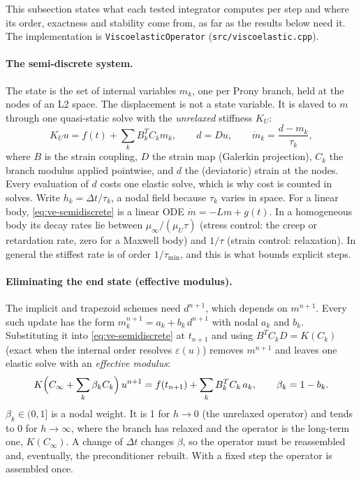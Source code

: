 \documentclass[11pt]{article}
\numberwithin{equation}{section}
\newcommand{\eps}{\varepsilon}
\newcommand{\code}[1]{\texttt{#1}}
\begin{document}
This subsection states what each tested integrator computes per step and
where its order, exactness and stability come from, as far as the results
below need it. The implementation is \code{ViscoelasticOperator}
(\code{src/viscoelastic.cpp}).

\paragraph{The semi-discrete system.}
The state is the set of internal variables $m_k$, one per Prony branch,
held at the nodes of an L2 space. The displacement is not a state
variable. It is slaved to $m$ through one quasi-static solve with the
\emph{unrelaxed} stiffness $K_U$:
\begin{equation}
  K_U u = f(t) + \sum_k B_k^{T} C_k m_k,\qquad d = D u,\qquad
  \dot m_k = \frac{d - m_k}{\tau_k},
  \label{eq:ve-semidiscrete}
\end{equation}
where $B$ is the strain coupling, $D$ the strain map (Galerkin projection),
$C_k$ the branch modulus applied pointwise, and $d$ the (deviatoric)
strain at the nodes. Every evaluation of $d$ costs one elastic solve, which
is why cost is counted in solves. Write $h_k=\Delta t/\tau_k$, a nodal field
because $\tau_k$ varies in space. For a linear body,
\eqref{eq:ve-semidiscrete} is a linear ODE $\dot m=-Lm+g(t)$. In a
homogeneous body its decay rates lie between $\mu_\infty/(\mu_U\tau)$
(stress control: the creep or retardation rate, zero for a Maxwell body)
and $1/\tau$ (strain control: relaxation). In general the stiffest rate is
of order $1/\tau_{\min}$, and this is what bounds explicit steps.

\paragraph{Eliminating the end state (effective modulus).}
The implicit and trapezoid schemes need $d^{n+1}$, which depends on
$m^{n+1}$. Every such update has the form
$m_k^{n+1}=a_k + b_k\,d^{n+1}$ with nodal $a_k$ and $b_k$. Substituting it
into \eqref{eq:ve-semidiscrete} at $t_{n+1}$ and using
$B^{T}C_kD=K(C_k)$ (exact when the internal order resolves $\eps(u)$)
removes $m^{n+1}$ and leaves one elastic solve with an \emph{effective
modulus}:
\begin{equation}
  K\Bigl(C_\infty+\sum_k\beta_kC_k\Bigr)\,u^{n+1}
  = f(t_{n+1}) + \sum_k B_k^{T}C_k\,a_k,
  \qquad \beta_k = 1-b_k .
  \label{eq:ve-effective}
\end{equation}
$\beta_k\in(0,1]$ is a nodal weight. It is 1 for $h\to0$ (the unrelaxed
operator) and tends to 0 for $h\to\infty$, where the branch has relaxed
and the operator is the long-term one, $K(C_\infty)$. A change of
$\Delta t$ changes $\beta$, so the operator must be reassembled and,
eventually, the preconditioner rebuilt. With a fixed step the operator is
assembled once.
\end{document}
